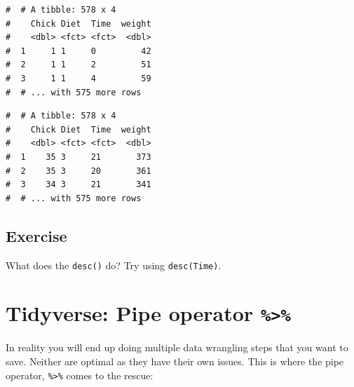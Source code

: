 \documentclass[a4paper,9pt,twocolumn,twoside,printwatermark=false]{pinp}
\begin{document}
\begin{ShadedResult}
\begin{verbatim}
#  # A tibble: 578 x 4
#    Chick Diet  Time  weight
#    <dbl> <fct> <fct>  <dbl>
#  1     1 1     0         42
#  2     1 1     2         51
#  3     1 1     4         59
#  # ... with 575 more rows
\end{verbatim}
\end{ShadedResult}

\begin{Shaded}
\begin{Highlighting}[]
\end{Highlighting}
\end{Shaded}

\begin{ShadedResult}
\begin{verbatim}
#  # A tibble: 578 x 4
#    Chick Diet  Time  weight
#    <dbl> <fct> <fct>  <dbl>
#  1    35 3     21       373
#  2    35 3     20       361
#  3    34 3     21       341
#  # ... with 575 more rows
\end{verbatim}
\end{ShadedResult}

\subsection{Exercise}\label{exercise-9}

What does the \texttt{desc()} do? Try using \texttt{desc(Time)}.

\section{\texorpdfstring{Tidyverse: Pipe operator
\texttt{\%\textgreater{}\%}}{Tidyverse: Pipe operator \%\textgreater{}\%}}\label{tidyverse-pipe-operator}

In reality you will end up doing multiple data wrangling steps that you
want to save. Neither are optimal as they have their own issues. This is
where the pipe operator, \texttt{\%\textgreater{}\%} comes to the
rescue:

\begin{Shaded}
\end{Shaded}
\end{document}
